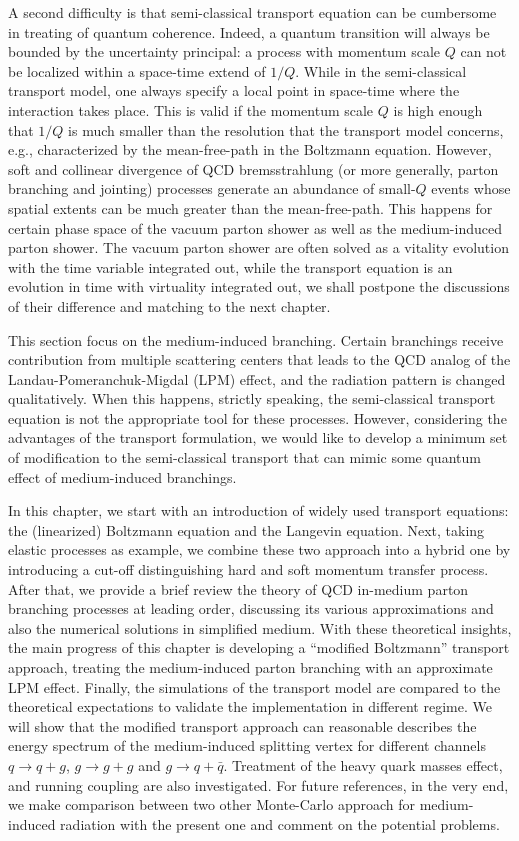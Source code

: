 A second difficulty is that semi-classical transport equation can be cumbersome in treating of quantum coherence.
Indeed, a quantum transition will always be bounded by the uncertainty principal: a process with momentum scale $Q$ can not be localized within a space-time extend of $1/Q$.
While in the semi-classical transport model, one always specify a local point in space-time where the interaction takes place.
This is valid if the momentum scale $Q$ is high enough that $1/Q$ is much smaller than the resolution that the transport model concerns, e.g., characterized by the mean-free-path in the Boltzmann equation.
However, soft and collinear divergence of QCD bremsstrahlung (or more generally, parton branching and jointing) processes generate an abundance of small-$Q$ events whose spatial extents can be much greater than the mean-free-path. 
This happens for certain phase space of the vacuum parton shower as well as the medium-induced parton shower.
The vacuum parton shower are often solved as a vitality evolution with the  time variable integrated out, while the transport equation is an evolution in time with virtuality integrated out, we shall postpone the discussions of their difference and matching to the next chapter.

This section focus on the medium-induced branching. 
Certain branchings receive contribution from multiple scattering centers that leads to the QCD analog of the Landau-Pomeranchuk-Migdal (LPM) effect, and the radiation pattern is changed qualitatively.
When this happens, strictly speaking, the semi-classical transport equation is not the appropriate tool for these processes.
However, considering the advantages of the transport formulation, we would like to develop a minimum set of modification to the semi-classical transport that can mimic some quantum effect of medium-induced branchings.


In this chapter, we start with an introduction of widely used transport equations: the (linearized) Boltzmann equation and the Langevin equation.
Next, taking elastic processes as example, we combine these two approach into a hybrid one by introducing a cut-off distinguishing hard and soft momentum transfer process.
After that, we provide a brief review the theory of QCD in-medium parton branching processes at leading order, discussing its various approximations and also the numerical solutions in simplified medium.
With these theoretical insights, the main progress of this chapter is developing a ``modified Boltzmann'' transport approach, treating the medium-induced parton branching with an approximate LPM effect.
Finally, the simulations of the transport model are compared to the theoretical expectations to validate the implementation in different regime.
We will show that the modified transport approach can reasonable describes the energy spectrum of the medium-induced splitting vertex for different channels $q\rightarrow q+g$, $g\rightarrow g+g$ and $g\rightarrow q+\bar{q}$.
Treatment of the heavy quark masses effect, and running coupling are also  investigated.
For future references, in the very end, we make comparison between two other Monte-Carlo approach for medium-induced radiation with the present one and comment on the potential problems.

